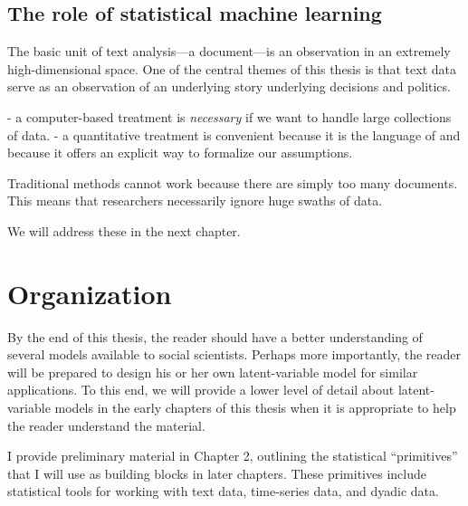 \subsection*{The role of statistical machine learning}

The basic unit of text analysis---a document---is an observation in an extremely
high-dimensional space.%
One of the central themes of this thesis is that text data serve as
an observation of an underlying story underlying decisions and
politics.

- a computer-based treatment is \emph{necessary} if we want to handle
large collections of data.  - a quantitative treatment is convenient
because it is the language of and because it offers an explicit way to
formalize our assumptions.

Traditional methods cannot work because there are simply too many documents.  This means that researchers necessarily ignore huge swaths of data.


We will address these in the  next chapter.
\cite{pearl:1985}


\section{Organization}

By the end of this thesis, the reader should have a better
understanding of several models available to social scientists.
Perhaps more importantly, the reader will be prepared to design his or
her own latent-variable model for similar applications. To this end,
we will provide a lower level of detail about latent-variable models
in the early chapters of this thesis when it is appropriate to help
the reader understand the material.

I provide preliminary material in Chapter 2, outlining the statistical
``primitives'' that I will use as building blocks in later chapters.
These primitives include statistical tools for working with text data,
time-series data, and dyadic data.

